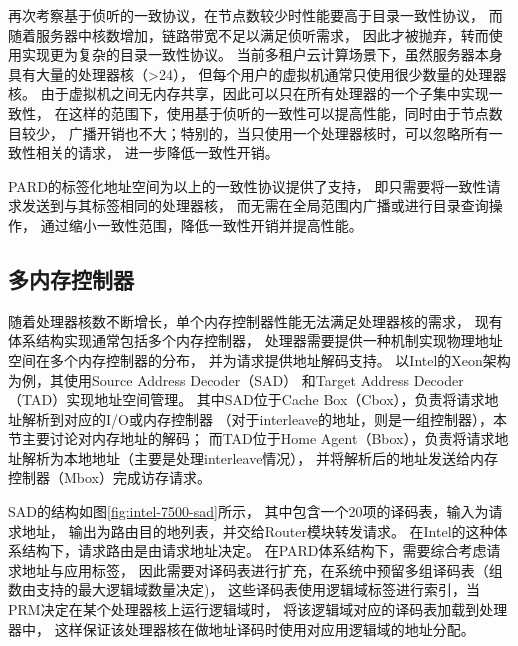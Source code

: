 再次考察基于侦听的一致协议，在节点数较少时性能要高于目录一致性协议，
而随着服务器中核数增加，链路带宽不足以满足侦听需求，
因此才被抛弃，转而使用实现更为复杂的目录一致性协议。
当前多租户云计算场景下，虽然服务器本身具有大量的处理器核（>24），
但每个用户的虚拟机通常只使用很少数量的处理器核\cite{}。    %
由于虚拟机之间无内存共享，因此可以只在所有处理器的一个子集中实现一致性，
在这样的范围下，使用基于侦听的一致性可以提高性能，同时由于节点数目较少，
广播开销也不大；特别的，当只使用一个处理器核时，可以忽略所有一致性相关的请求，
进一步降低一致性开销。

PARD的标签化地址空间为以上的一致性协议提供了支持，
即只需要将一致性请求发送到与其标签相同的处理器核，
而无需在全局范围内广播或进行目录查询操作，
通过缩小一致性范围，降低一致性开销并提高性能。



\subsection{多内存控制器}

随着处理器核数不断增长，单个内存控制器性能无法满足处理器核的需求，
现有体系结构实现通常包括多个内存控制器，
处理器需要提供一种机制实现物理地址空间在多个内存控制器的分布，
并为请求提供地址解码支持。
以Intel的Xeon架构为例，其使用Source Address Decoder（SAD）
和Target Address Decoder（TAD）实现地址空间管理\cite{intel-xeon-7500}。
其中SAD位于Cache Box（Cbox），负责将请求地址解析到对应的I/O或内存控制器
（对于interleave的地址，则是一组控制器），本节主要讨论对内存地址的解码；
而TAD位于Home Agent（Bbox），负责将请求地址解析为本地地址（主要是处理interleave情况），
并将解析后的地址发送给内存控制器（Mbox）完成访存请求。

SAD的结构如图\ref{fig:intel-7500-sad}所示，
其中包含一个20项的译码表，输入为请求地址，
输出为路由目的地列表，并交给Router模块转发请求。
在Intel的这种体系结构下，请求路由是由请求地址决定。
在PARD体系结构下，需要综合考虑请求地址与应用标签，
因此需要对译码表进行扩充，在系统中预留多组译码表（组数由支持的最大逻辑域数量决定)，
这些译码表使用逻辑域标签进行索引，当PRM决定在某个处理器核上运行逻辑域时，
将该逻辑域对应的译码表加载到处理器中，
这样保证该处理器核在做地址译码时使用对应用逻辑域的地址分配。

